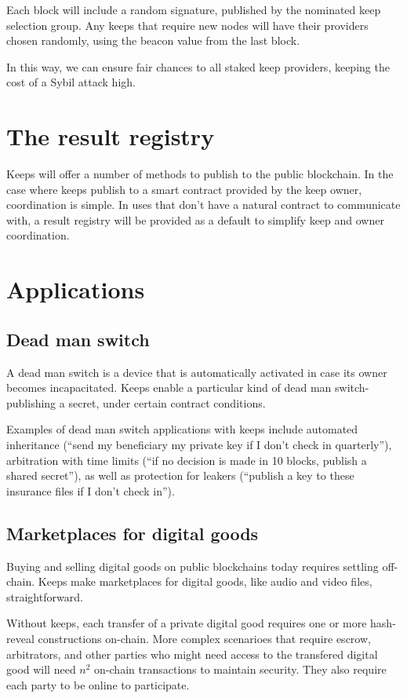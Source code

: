 \documentclass[11pt]{article}
\begin{document}
Each block will include a random signature, published by the nominated
keep selection group. Any keeps that require new nodes will have their
providers chosen randomly, using the beacon value from the last block.

In this way, we can ensure fair chances to all staked keep providers,
keeping the cost of a Sybil attack high.

\section{The result registry}

Keeps will offer a number of methods to publish to the public
blockchain. In the case where keeps publish to a smart contract
provided by the keep owner, coordination is simple. In uses that don't
have a natural contract to communicate with, a result registry will be
provided as a default to simplify keep and owner coordination.

\section{Applications}
\label{applications}

\subsection{Dead man switch}

A dead man switch is a device that is automatically activated in case
its owner becomes incapacitated. Keeps enable a particular kind of
dead man switch- publishing a secret, under certain contract
conditions.

Examples of dead man switch applications with keeps include automated
inheritance (``send my beneficiary my private key if I don't check in
quarterly''), arbitration with time limits (``if no decision is made in
10 blocks, publish a shared secret''), as well as protection for
leakers (``publish a key to these insurance files if I don't check
in'').

\subsection{Marketplaces for digital goods}

Buying and selling digital goods on public blockchains today requires
settling off-chain. Keeps make marketplaces for digital goods, like
audio and video files, straightforward.

Without keeps, each transfer of a private digital good requires one or
more hash-reveal constructions on-chain. More complex scenarioes
that require escrow, arbitrators, and other parties who might need
access to the transfered digital good will need ${n^2}$ on-chain
transactions to maintain security. They also require each party to be
online to participate.
\end{document}

